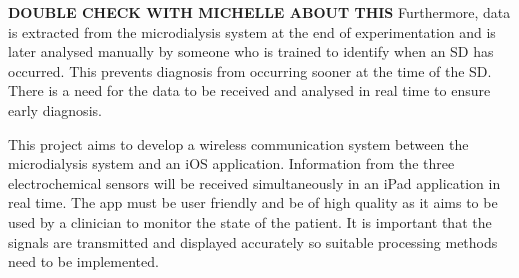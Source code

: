 \textbf{DOUBLE CHECK WITH MICHELLE ABOUT THIS}
Furthermore, data is extracted from the microdialysis system at the end of experimentation and is later analysed manually by someone who is trained to identify when an SD has occurred. This prevents diagnosis from occurring sooner at the time of the SD. There is a need for the data to be received and analysed in real time to ensure early diagnosis. 

This project aims to develop a wireless communication system between the microdialysis system and an iOS application. Information from the three electrochemical sensors will be received simultaneously in an iPad application in real time. The app must be user friendly and be of high quality as it aims to be used by a clinician to monitor the state of the patient. It is important that the signals are transmitted and displayed accurately so suitable processing methods need to be implemented. 

